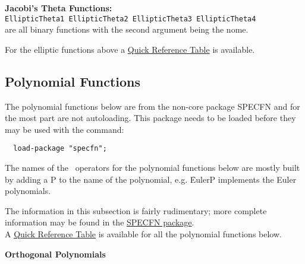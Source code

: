 \textbf{Jacobi's Theta Functions:}\\
\texttt{EllipticTheta1 EllipticTheta2 EllipticTheta3 EllipticTheta4}\\
are all binary functions with the second argument being the nome.

For the elliptic functions above
a \hyperlink{SPECFNTAB3}{Quick Reference Table} is available.

\subsection{Polynomial Functions}
The polynomial functions below are from the non-core package SPECFN
and for the most part are not autoloading. This package needs to be loaded
before they may be used with the command:
\begin{verbatim}
  load-package "specfn";
\end{verbatim}
The names of the \REDUCE\  operators for the polynomial functions below
are mostly built by adding a P to the name of the polynomial,
e.g. \f{EulerP} implements the Euler polynomials.

The information in this subsection is fairly rudimentary; more complete
information may be found in the \hyperlink{POLYFN}{SPECFN package}.\\
A \hyperlink{SPECFNTAB4}{Quick Reference Table} is available for all the
polynomial functions below.

\textbf{Orthogonal Polynomials}
 

